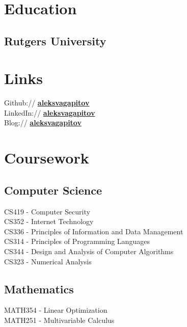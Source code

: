\documentclass[]{Resume}
\begin{document}
\begin{minipage}[t]{0.33\textwidth} 


\section{Education} 

\subsection{Rutgers University}
\sectionsep



\section{Links} 
Github:// \href{https://github.com/aleksvagapitov}{\bf aleksvagapitov} \\
LinkedIn://  \href{https://www.linkedin.com/in/aleksvagapitov}{\bf aleksvagapitov} \\
Blog://  \href{https://aleksvagapitov.github.io}{\bf aleksvagapitov}


\section{Coursework}

\subsection{Computer Science}
CS419 - Computer Security \\
CS352 - Internet Technology \\
CS336 - Principles of Information and Data Management \\
CS314 - Principles of Programming Languages \\
CS344 - Design and Analysis of Computer Algorithms \\
CS323 - Numerical Analysis \\
\sectionsep
\subsection{Mathematics}
MATH354 - Linear Optimization \\
MATH251 - Multivariable Calculus


\end{minipage}
\end{document}
